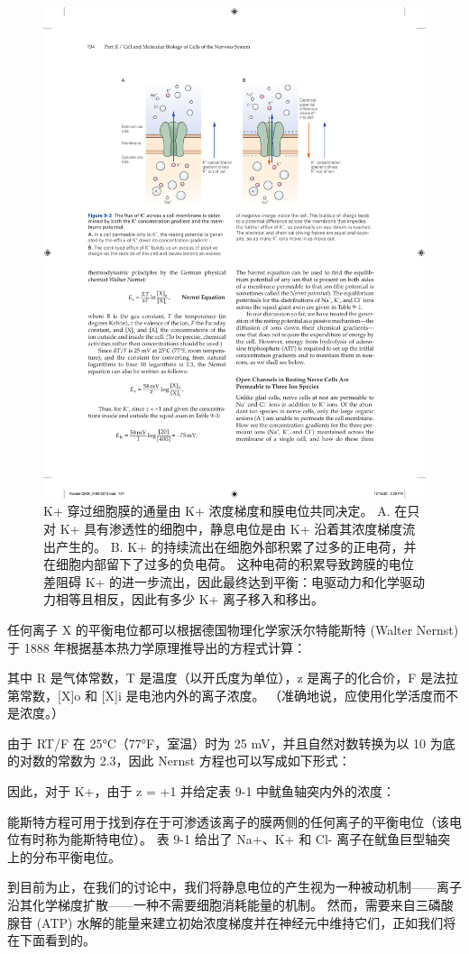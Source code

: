 \begin{figure}[htbp]
	\centering
	\includegraphics[width=0.7\linewidth]{chap09/fig_9_3}
	\caption{K+ 穿过细胞膜的通量由 K+ 浓度梯度和膜电位共同决定。 A. 在只对 K+ 具有渗透性的细胞中，静息电位是由 K+ 沿着其浓度梯度流出产生的。 B. K+ 的持续流出在细胞外部积累了过多的正电荷，并在细胞内部留下了过多的负电荷。 这种电荷的积累导致跨膜的电位差阻碍 K+ 的进一步流出，因此最终达到平衡：电驱动力和化学驱动力相等且相反，因此有多少 K+ 离子移入和移出。}
	\label{fig:9_3}
\end{figure}


任何离子 X 的平衡电位都可以根据德国物理化学家沃尔特能斯特 (Walter Nernst) 于 1888 年根据基本热力学原理推导出的方程式计算：


其中 R 是气体常数，T 是温度（以开氏度为单位），z 是离子的化合价，F 是法拉第常数，[X]o 和 [X]i 是电池内外的离子浓度。
（准确地说，应使用化学活度而不是浓度。）


由于 RT/F 在 25°C（77°F，室温）时为 25 mV，并且自然对数转换为以 10 为底的对数的常数为 2.3，因此 Nernst 方程也可以写成如下形式：


因此，对于 K+，由于 z = +1 并给定表 9-1 中鱿鱼轴突内外的浓度：


能斯特方程可用于找到存在于可渗透该离子的膜两侧的任何离子的平衡电位（该电位有时称为能斯特电位）。
表 9-1 给出了 Na+、K+ 和 Cl- 离子在鱿鱼巨型轴突上的分布平衡电位。


到目前为止，在我们的讨论中，我们将静息电位的产生视为一种被动机制——离子沿其化学梯度扩散——一种不需要细胞消耗能量的机制。
然而，需要来自三磷酸腺苷 (ATP) 水解的能量来建立初始浓度梯度并在神经元中维持它们，正如我们将在下面看到的。



